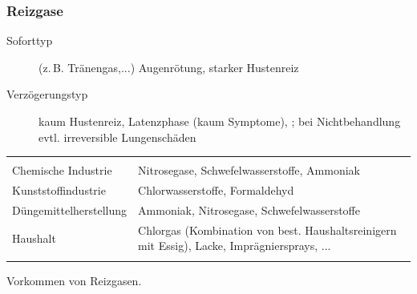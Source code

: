 {


\subsubsection{Reizgase}


{%
\begin{description}
  \item[Soforttyp] (z.\,B. Tränengas,...) Augenrötung, starker Hustenreiz
  \item[Verzögerungstyp]  kaum
  Hustenreiz, Latenzphase (kaum Symptome),
  ;
  bei Nichtbehandlung evtl. irreversible Lungenschäden
\end{description}
}{

}{}{}{}

{}{}{%
\begin{tabulary}{\linewidth}{LL}\addlinespace\toprule\addlinespace
\noindent{} & \noindent{}
\\\addlinespace\midrule\addlinespace
Chemische Industrie 
&
Nitrosegase,  Schwefelwasserstoffe, Ammoniak
\\\addlinespace
Kunststoffindustrie 
&
Chlorwasserstoffe,  Formaldehyd
\\\addlinespace
Düngemittelherstellung 
&
Ammoniak,  Nitrosegase, Schwefelwasserstoffe
\\\addlinespace
Haushalt 
&
Chlorgas (Kombination von best.  Haushaltsreinigern mit
Essig), Lacke,  Imprägniersprays, ...
\\\addlinespace\bottomrule
\end{tabulary}
}{Vorkommen von Reizgasen.}{}





}

